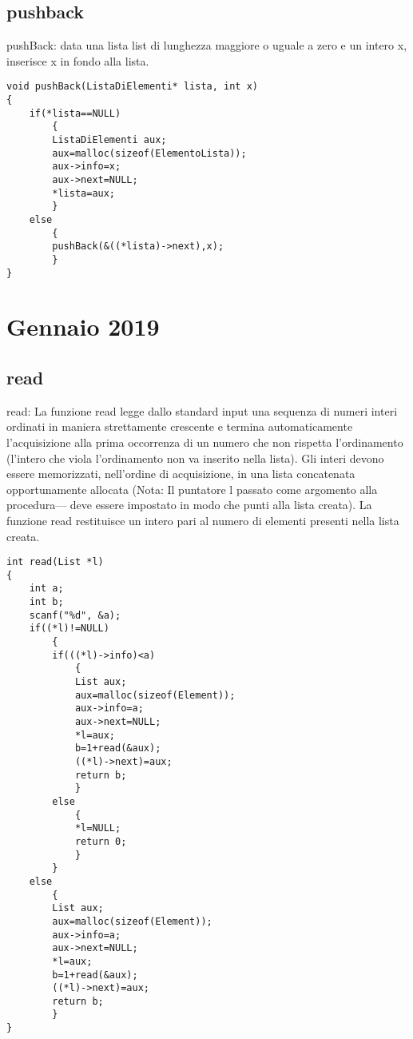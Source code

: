 \documentclass[a4paper,12pt,openany]{book}
\begin{document}
	 \section{pushback}
pushBack: data una lista list di lunghezza maggiore o uguale a zero e un intero x, inserisce x in fondo alla lista.
   \begin{lstlisting}
void pushBack(ListaDiElementi* lista, int x)
{
	if(*lista==NULL)
		{
		ListaDiElementi aux;
		aux=malloc(sizeof(ElementoLista));
		aux->info=x;
		aux->next=NULL;
		*lista=aux;
		}
	else
		{
		pushBack(&((*lista)->next),x);
		}
}
	\end{lstlisting}
	
	\chapter{Gennaio 2019}
  \section{read}
read: La funzione read legge dallo standard input una sequenza di numeri interi ordinati in maniera strettamente crescente e termina automaticamente l’acquisizione alla prima occorrenza di un numero che non rispetta l’ordinamento (l’intero che viola l’ordinamento non va inserito nella lista).  Gli interi devono essere memorizzati, nell’ordine di acquisizione, in una lista concatenata opportunamente allocata (Nota:  Il puntatore l passato come argomento alla procedura— deve essere impostato in modo che punti alla lista creata).  La funzione read restituisce un intero pari al numero di elementi presenti nella lista creata.
   \begin{lstlisting}
int read(List *l)
{
	int a;
	int b;
	scanf("%d", &a);
	if((*l)!=NULL)
		{
		if(((*l)->info)<a)
			{
			List aux;
			aux=malloc(sizeof(Element));
			aux->info=a;
			aux->next=NULL;
			*l=aux;
			b=1+read(&aux);
			((*l)->next)=aux;
			return b;
			}
		else
			{
			*l=NULL;
			return 0;
			}
		}
	else
		{
		List aux;
		aux=malloc(sizeof(Element));
		aux->info=a;
		aux->next=NULL;
		*l=aux;
		b=1+read(&aux);
		((*l)->next)=aux;
		return b;
		}
}
	\end{lstlisting}
\end{document}
